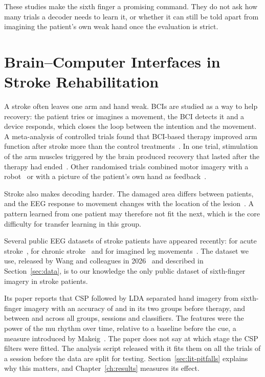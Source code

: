 These studies make the sixth finger a promising command. They do not ask how many trials a
decoder needs to learn it, or whether it can still be told apart from imagining the
patient's own weak hand once the evaluation is strict.

\section{Brain--Computer Interfaces in Stroke Rehabilitation}\label{sec:lit-stroke}

A stroke often leaves one arm and hand weak. BCIs are studied as a way to help recovery: the
patient tries or imagines a movement, the BCI detects it and a device responds, which closes
the loop between the intention and the movement. A meta-analysis of controlled trials found
that BCI-based therapy improved arm function after stroke more than the control
treatments~\cite{cervera2018}. In one trial, stimulation of the arm muscles triggered by the
brain produced recovery that lasted after the therapy had ended~\cite{biasiucci2018}. Other
randomised trials combined motor imagery with a robot~\cite{ang2015rct} or with a picture of
the patient's own hand as feedback~\cite{pichiorri2015}.

Stroke also makes decoding harder. The damaged area differs between patients, and the EEG
response to movement changes with the location of the lesion~\cite{park2016}. A pattern
learned from one patient may therefore not fit the next, which is the core difficulty for
transfer learning in this group.

Several public EEG datasets of stroke patients have appeared recently: for acute
stroke~\cite{liu2024acute}, for chronic stroke~\cite{lu2026chronic} and for imagined leg
movements~\cite{liu2025lowerlimb}. The dataset we use, released by Wang and colleagues in
2026~\cite{wang2026dataset} and described in Section~\ref{sec:data}, is to our knowledge the only
public dataset of sixth-finger imagery in stroke patients.

Its paper reports that CSP followed by LDA separated hand imagery from sixth-finger
imagery with an accuracy of \pct{\rqOnePublishedGroupBCspLda} and
\pct{\rqOnePublishedGroupTCspLda} in its two groups before therapy, and between
\pct{\rqOnePublishedFollowGroupTCspSvm} and \pct{\rqOnePublishedFollowGroupBCspSvm} across all
groups, sessions and classifiers. The features were the power of the mu rhythm over time,
relative to a baseline before the cue, a measure introduced by Makeig~\cite{makeig1993}. The
paper does not say at which stage the CSP filters were fitted. The analysis script released
with it fits them on all the trials of a session before the data are split for testing.
Section~\ref{sec:lit-pitfalls} explains why this matters, and Chapter~\ref{ch:results}
measures its effect.

